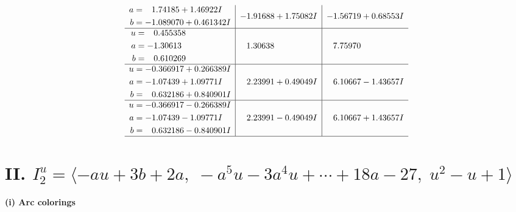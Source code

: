 \documentclass[1p]{elsarticle_modified}
\theoremstyle{definition}
\begin{document}
$$\begin{array}{c|c|c}
\begin{aligned}
a &= \phantom{-}1.74185 + 1.46922 I \\
b &= -1.089070 + 0.461342 I\end{aligned}
 & -1.91688 + 1.75082 I & -1.56719 + 0.68553 I \\ \hline\begin{aligned}
u &= \phantom{-}0.455358\phantom{ +0.000000I} \\
a &= -1.30613\phantom{ +0.000000I} \\
b &= \phantom{-}0.610269\phantom{ +0.000000I}\end{aligned}
 & \phantom{-}1.30638\phantom{ +0.000000I} & \phantom{-}7.75970\phantom{ +0.000000I} \\ \hline\begin{aligned}
u &= -0.366917 + 0.266389 I \\
a &= -1.07439 + 1.09771 I \\
b &= \phantom{-}0.632186 + 0.840901 I\end{aligned}
 & \phantom{-}2.23991 + 0.49049 I & \phantom{-}6.10667 - 1.43657 I \\ \hline\begin{aligned}
u &= -0.366917 - 0.266389 I \\
a &= -1.07439 - 1.09771 I \\
b &= \phantom{-}0.632186 - 0.840901 I\end{aligned}
 & \phantom{-}2.23991 - 0.49049 I & \phantom{-}6.10667 + 1.43657 I\\
 \hline 
 \end{array}$$\newpage\newpage\renewcommand{\arraystretch}{1}
\centering \section*{II. $I^u_{2}= \langle - a u+3 b+2 a,\;- a^5 u-3 a^4 u+\cdots+18 a-27,\;u^2- u+1 \rangle$}
\flushleft \textbf{(i) Arc colorings}\\
\end{document}
